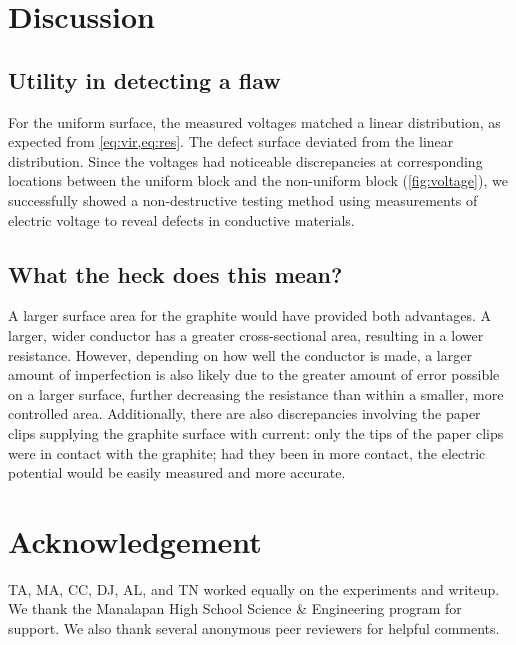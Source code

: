 \documentclass[10pt,journal,twoside]{IEEEtran} %
\begin{document}





\section{Discussion}

\subsection{Utility in detecting a flaw}
For the uniform surface, the measured voltages matched a linear distribution, as expected from \cref{eq:vir,eq:res}. The defect surface deviated from the linear distribution. Since the voltages had noticeable discrepancies at corresponding locations between the uniform block and the non-uniform block (\cref{fig:voltage}), we successfully showed a non-destructive testing method using measurements of electric voltage to reveal defects in conductive materials.

\subsection{What the heck does this mean?}
A larger surface area for the graphite would have provided both advantages. A larger, wider conductor has a greater cross-sectional area, resulting in a lower resistance. However, depending on how well the conductor is made, a larger amount of imperfection is also likely due to the greater amount of error possible on a larger surface, further decreasing the resistance than within a smaller, more controlled area. Additionally, there are also discrepancies involving the paper clips supplying the graphite surface with current: only the tips of the paper clips were in contact with the graphite; had they been in more contact, the electric potential would be easily measured and more accurate.









\section*{Acknowledgement}
TA, MA, CC, DJ, AL, and TN worked equally on the experiments and writeup. We thank the Manalapan High School Science \& Engineering program for support. We also thank several anonymous peer reviewers for helpful comments.  
\end{document}
